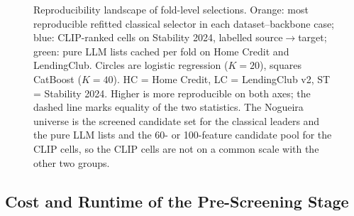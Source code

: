 \documentclass[final,5p,twocolumn]{elsarticle}
\newcommand{\Kfeat}{K}
\begin{document}
\begin{figure}[htbp]
\caption{Reproducibility landscape of fold-level selections. Orange: most reproducible refitted classical selector in each dataset--backbone case; blue: CLIP-ranked cells on Stability 2024, labelled source$\rightarrow$target; green: pure LLM lists cached per fold on Home Credit and LendingClub. Circles are logistic regression ($\Kfeat=20$), squares CatBoost ($\Kfeat=40$). HC = Home Credit, LC = LendingClub v2, ST = Stability 2024. Higher is more reproducible on both axes; the dashed line marks equality of the two statistics. The Nogueira universe is the screened candidate set for the classical leaders and the pure LLM lists and the 60- or 100-feature candidate pool for the CLIP cells, so the CLIP cells are not on a common scale with the other two groups.}
\label{fig:stability}
\end{figure}

\subsection{Cost and Runtime of the Pre-Screening Stage}
\label{subsec:cost_runtime}
\end{document}

